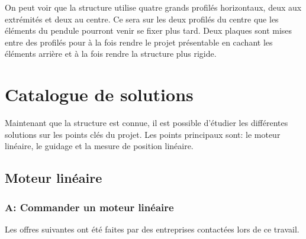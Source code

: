 On peut voir que la structure utilise quatre grands profilés horizontaux, deux aux extrémités et deux au centre. Ce sera sur les deux profilés du centre que
les éléments du pendule pourront venir se fixer plus tard. Deux plaques sont mises entre des profilés pour à la fois rendre le projet présentable
en cachant les éléments arrière et à la fois rendre la structure plus rigide.

\section{Catalogue de solutions}\label{sec:CatSol}
Maintenant que la structure est connue, il est possible d'étudier les différentes solutions sur les points clés du projet.
Les points principaux sont: le moteur linéaire, le guidage et la mesure de position linéaire.

\subsection{Moteur linéaire}
\subsubsection{A: Commander un moteur linéaire}
Les offres suivantes ont été faites par des entreprises contactées lors de ce travail.

\begin{table}[H]
  \centering
  \caption{Offres pour le moteur linéaire}
  \label{tab:OffreMot}
\end{table}

